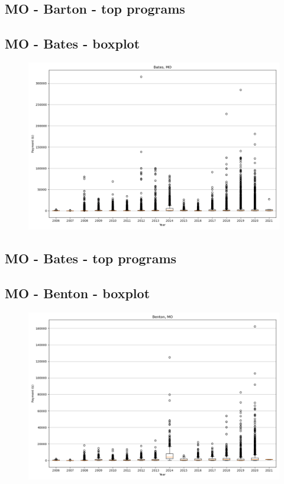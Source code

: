\subsection*{MO - Barton - top programs}

\newpage
\subsection*{MO - Bates - boxplot}
\begin{figure}[h]
\centering
\includegraphics[width=7in]{../output/boxplots/counties/Bates-MO_boxplot.png}
\end{figure}


\subsection*{MO - Bates - top programs}

\newpage
\subsection*{MO - Benton - boxplot}
\begin{figure}[h]
\centering
\includegraphics[width=7in]{../output/boxplots/counties/Benton-MO_boxplot.png}
\end{figure}


